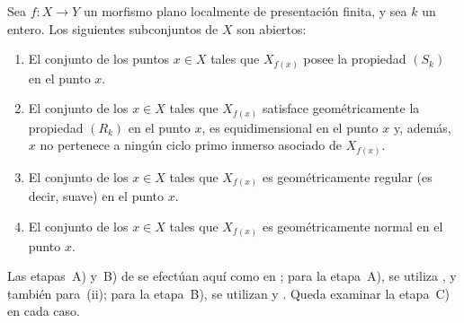 \begin{theorem}[12.1.6]
\label{IV.12.1.6}
Sea $f:X\to Y$ un morfismo \textup{plano} localmente de presentación finita, y sea $k$ un entero.
Los siguientes subconjuntos de $X$ son abiertos:
\begin{enumerate}[label=\textup{(\roman*)}]
  \item El conjunto de los puntos $x\in X$ tales que $X_{f(x)}$ posee la propiedad $(S_k)$ en el punto $x$.
  \item El conjunto de los $x\in X$ tales que $X_{f(x)}$ satisface geométricamente la propiedad $(R_k)$ en el punto $x$, es equidimensional en el punto $x$ y, además, $x$ no pertenece a ningún ciclo primo inmerso asociado de $X_{f(x)}$.
  \item El conjunto de los $x\in X$ tales que $X_{f(x)}$ es geométricamente regular \textup{(es decir,} suave\textup{)} en el punto $x$.
  \item El conjunto de los $x\in X$ tales que $X_{f(x)}$ es geométricamente normal en el punto $x$.
\end{enumerate}

Las etapas~A) y~B) de  se efectúan aquí como en ; para la etapa~A), se utiliza , y también  para~(ii); para la etapa~B), se utilizan  y .
Queda examinar la etapa~C) en cada caso.
\end{theorem}

